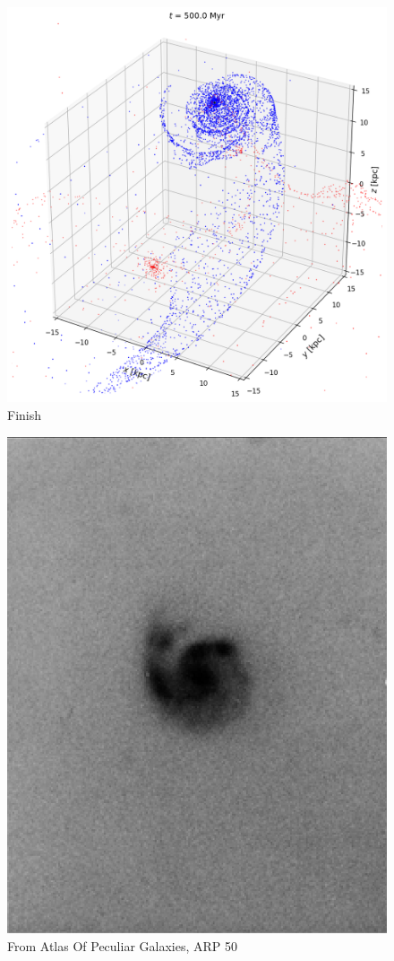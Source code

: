 \documentclass[linenumbers,RNAAS,trackchanges]{aastex631}
\begin{document}
\begin{figure}[H]
    \centering
    \includegraphics[scale=.40]{comparison_galaxy/ARP_50_output.png}
    \caption{Finish}
    \label{fig:code}
\end{figure}
\begin{figure}[H]
    \centering
    \includegraphics[scale=.50]{comparison_galaxy/arp_50.png}
    \caption{From Atlas Of Peculiar Galaxies, ARP 50}
    \label{fig:code}
\end{figure}
\end{document}
